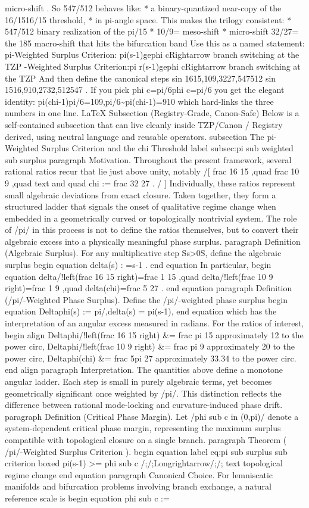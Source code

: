 micro-shift . So 547/512 behaves like: * a binary-quantized near-copy of the 16/1516/15 threshold, * in pi-angle space. This makes the trilogy consistent: * 547/512 binary realization of the pi/15 * 10/9= meso-shift * micro-shift 32/27= the 185 macro-shift that hits the bifurcation band Use this as a named statement: pi-Weighted Surplus Criterion: pi(s-1)gephi cRightarrow branch switching at the TZP -Weighted Surplus Criterion:pi r(s-1)gephi cRightarrow branch switching at the TZP And then define the canonical steps sin 1615,109,3227,547512 sin 1516,910,2732,512547 . If you pick phi c=pi/6phi c=pi/6 you get the elegant identity: pi(chi-1)pi/6=109,pi/6\textasciitilde{}pi(chi-1)=910 which hard-links the three numbers in one line. LaTeX Subsection (Registry-Grade, Canon-Safe) Below is a self-contained subsection that can live cleanly inside TZP/Canon / Registry derived, using neutral language and reusable operators. subsection The pi-Weighted Surplus Criterion and the chi Threshold label subsec:pi sub weighted sub surplus paragraph Motivation. Throughout the present framework, several rational ratios recur that lie just above unity, notably /[ frac 16 15 ,quad frac 10 9 ,quad text and quad chi := frac 32 27 . / ] Individually, these ratios represent small algebraic deviations from exact closure. Taken together, they form a structured ladder that signals the onset of qualitative regime change when embedded in a geometrically curved or topologically nontrivial system. The role of /pi/ in this process is not to define the ratios themselves, but to convert their algebraic excess into a physically meaningful phase surplus. paragraph Definition (Algebraic Surplus). For any multiplicative step Ss>0S, define the algebraic surplus begin equation delta(s) : =s-1 . end equation In particular, begin equation delta/!left(frac 16 15 right)=frac 1 15 ,quad delta/!left(frac 10 9 right)=frac 1 9 ,quad delta(chi)=frac 5 27 . end equation paragraph Definition (/pi/-Weighted Phase Surplus). Define the /pi/-weighted phase surplus begin equation Deltaphi(s) := pi/,delta(s) = pi(s-1), end equation which has the interpretation of an angular excess measured in radians. For the ratios of interest, begin align Deltaphi/!left(frac 16 15 right) \&= frac pi 15 approximately 12 to the power circ, Deltaphi/!left(frac 10 9 right) \&= frac pi 9 approximately 20 to the power circ, Deltaphi(chi) \&= frac 5pi 27 approximately 33.34 to the power circ. end align paragraph Interpretation. The quantities above define a monotone angular ladder. Each step is small in purely algebraic terms, yet becomes geometrically significant once weighted by /pi/. This distinction reflects the difference between rational mode-locking and curvature-induced phase drift. paragraph Definition (Critical Phase Margin). Let /phi sub c in (0,pi)/ denote a system-dependent critical phase margin, representing the maximum surplus compatible with topological closure on a single branch. paragraph Theorem ( /pi/-Weighted Surplus Criterion ). begin equation label eq:pi sub surplus sub criterion boxed pi(s-1) >= phi sub c /;/;Longrightarrow/;/; text topological regime change end equation paragraph Canonical Choice. For lemniscatic manifolds and bifurcation problems involving branch exchange, a natural reference scale is begin equation phi sub c := 